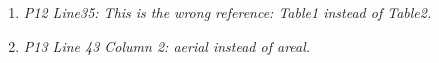 \documentclass{article}
\begin{document}
\begin{enumerate}
{%
%
  }
	
	\item \textit{P12 Line35: This is the wrong reference: Table1 instead of Table2.}

	
	\item \textit{P13 Line 43 Column 2: aerial instead of areal.}

	
\end{enumerate}
\newpage
\end{document}
